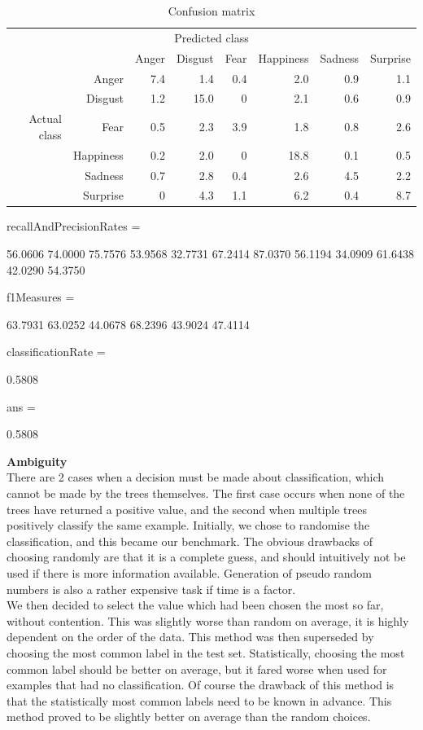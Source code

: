 \documentclass[12pt]{article}
\begin{document}
\begin{table}
\centering
\begin{tabular}{r r | r r r r r r}
\multicolumn{8}{c}{Predicted class} \\
&  & Anger & Disgust & Fear & Happiness & Sadness & Surprise \\
\hline
& Anger & 7.4 & 1.4  & 0.4 & 2.0  & 0.9 & 1.1 \\
 & Disgust & 1.2 & 15.0 & 0   & 2.1  & 0.6 & 0.9 \\
Actual class & Fear & 0.5 & 2.3  & 3.9 & 1.8  & 0.8 & 2.6 \\
 & Happiness & 0.2 & 2.0  & 0   & 18.8 & 0.1 & 0.5 \\
& Sadness & 0.7 & 2.8  & 0.4 & 2.6  & 4.5 & 2.2 \\
& Surprise & 0   & 4.3  & 1.1 & 6.2  & 0.4 & 8.7 \\
\end{tabular}
\caption{Confusion matrix}
\end{table}


          recallAndPrecisionRates =

          56.0606   74.0000
          75.7576   53.9568
          32.7731   67.2414
          87.0370   56.1194
          34.0909   61.6438
          42.0290   54.3750


          f1Measures =

          63.7931
          63.0252
          44.0678
          68.2396
          43.9024
          47.4114


          classificationRate =

          0.5808


          ans =

          0.5808

{\bf Ambiguity} \\

There are 2 cases when a decision must be made about classification, which cannot be made by the trees themselves. The first case occurs when none of the trees have returned a positive value, and the second when multiple trees positively classify the same example. Initially, we chose to randomise the classification, and this became our benchmark. The obvious drawbacks of choosing randomly are that it is a complete guess, and should intuitively not be used if there is more information available. Generation of pseudo random numbers is also a rather expensive task if time is a factor. \\

We then decided to select the value which had been chosen the most so far, without contention. This was slightly worse than random on average, it is highly dependent on the order of the data. This method was then superseded by choosing the most common label in the test set. Statistically, choosing the most common label should be better on average, but it fared worse when used for examples that had no classification. Of course the drawback of this method is that the statistically most common labels need to be known in advance. This method proved to be slightly better on average than the random choices. \\
\end{document}
